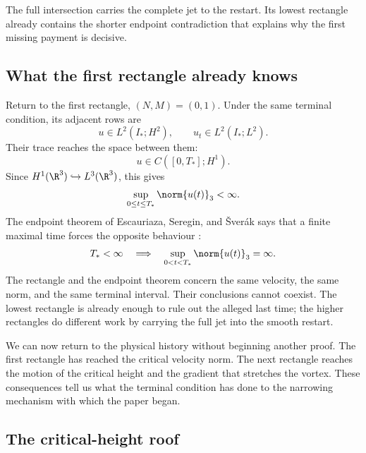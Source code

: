 The full intersection carries the complete jet to the restart.  Its lowest
rectangle already contains the shorter endpoint contradiction that explains
why the first missing payment is decisive.

\subsection{What the first rectangle already knows}\label{sub:FromFiniteRectanglesToClassicalEstimates}

Return to the first rectangle, \((N,M)=(0,1)\).  Under the same terminal
condition, its adjacent rows are
\[
  u\in L^2(I_*;H^2),
  \qquad
  u_t\in L^2(I_*;L^2).
\]
Their trace reaches the space between them:
\[
  u\in C([0,T_*];H^1).
\]
Since \(H^1(\R^3)\hookrightarrow L^3(\R^3)\), this gives
\begin{equation}\label{eq:EndpointCriterionFromLowRectangle}
  \sup_{0\leq t\leq T_*}\norm{u(t)}_3<\infty.
\end{equation}
The endpoint theorem of Escauriaza, Seregin, and \v{S}ver\'ak says that a
finite maximal time forces the opposite behaviour
\parencite{EscauriazaSereginSverak2003}:
\begin{equation}\label{eq:FiniteTimeLThreeEscape}
  T_*<\infty
  \quad\Longrightarrow\quad
  \sup_{0<t<T_*}\norm{u(t)}_3=\infty.
\end{equation}
The rectangle and the endpoint theorem concern the same velocity, the same
norm, and the same terminal interval.  Their conclusions cannot coexist.  The
lowest rectangle is already enough to rule out the alleged last time; the
higher rectangles do different work by carrying the full jet into the smooth
restart.

We can now return to the physical history without beginning another proof.  The
first rectangle has reached the critical velocity norm.  The next rectangle
reaches the motion of the critical height and the gradient that stretches the
vortex.  These consequences tell us what the terminal condition has done to
the narrowing mechanism with which the paper began.

\subsection{The critical-height roof}\label{sub:ClassicalContinuationCriteriaInsideFiniteRectangles}

